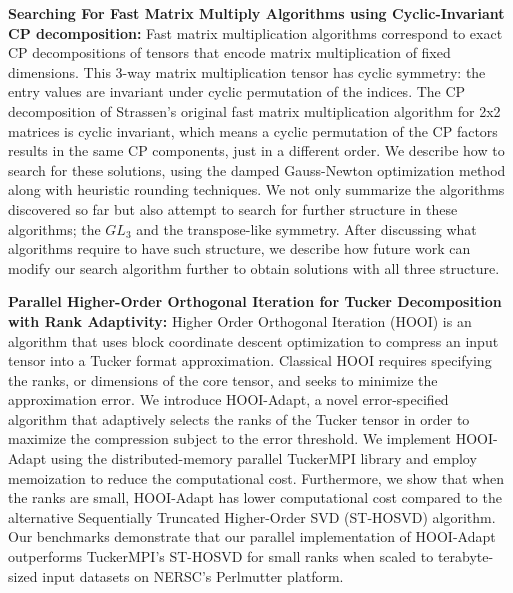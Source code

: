 \documentclass[MS]{wfuthesis}
\begin{document}
    \textbf{Searching For Fast Matrix Multiply Algorithms using Cyclic-Invariant
    CP decomposition:} Fast matrix multiplication algorithms correspond to exact
    CP decompositions of tensors that encode matrix multiplication of fixed
    dimensions. This 3-way matrix multiplication tensor has cyclic symmetry: the
    entry values are invariant under cyclic permutation of the indices. The CP
    decomposition of Strassen's original fast matrix multiplication algorithm
    for 2x2 matrices is cyclic invariant, which means a cyclic permutation of
    the CP factors results in the same CP components, just in a different order.
    We describe how to search for these solutions, using the damped Gauss-Newton
    optimization method along with heuristic rounding techniques. We not only
    summarize the algorithms discovered so far but also attempt to search for
    further structure in these algorithms; the $GL_3$ and the transpose-like
    symmetry. After discussing what algorithms require to have such structure,
    we describe how future work can modify our search algorithm further to
    obtain solutions with all three structure.
    


    \textbf{Parallel Higher-Order Orthogonal Iteration for Tucker Decomposition
    with Rank Adaptivity:} Higher Order Orthogonal Iteration (HOOI) is an
    algorithm that uses block coordinate descent optimization to compress an
    input tensor into a Tucker format approximation. Classical HOOI requires
    specifying the ranks, or dimensions of the core tensor, and seeks to
    minimize the approximation error. 	We introduce HOOI-Adapt, a novel
    error-specified algorithm that adaptively selects the ranks of the Tucker
    tensor in order to maximize the compression subject to the error threshold.
    We implement HOOI-Adapt using the distributed-memory parallel TuckerMPI
    library and employ memoization to reduce the computational cost.
    Furthermore, we show that when the ranks are small, HOOI-Adapt has lower
    computational cost compared to the alternative Sequentially Truncated
    Higher-Order SVD (ST-HOSVD) algorithm. Our benchmarks demonstrate that our
    parallel implementation of HOOI-Adapt outperforms TuckerMPI's ST-HOSVD for
    small ranks when scaled to terabyte-sized input datasets on NERSC's
    Perlmutter platform.





    \chapters{}
\end{document}
